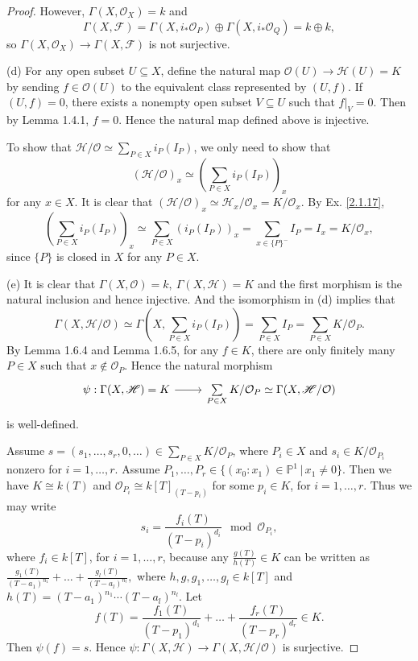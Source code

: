 \documentclass{amsart}
\theoremstyle{remark}\newtheorem{rmk}[theorem]{Remark}
\begin{document}
\begin{proof}
	However, $\Gamma(X,\mathcal{O}_X)=k$ and $$\Gamma(X,\mathscr{F})=\Gamma(X,i_*\mathcal{O}_P)\oplus\Gamma(X,i_*\mathcal{O}_Q)=k\oplus k,$$ so $\Gamma(X,\mathcal{O}_X)\to\Gamma(X,\mathscr{F})$ is not surjective.
	
	(d) For any open subset $U\subseteq X$, define the natural map $\mathcal{O}(U)\to\mathscr{H}(U)=K$ by sending $f\in\mathcal{O}(U)$ to the equivalent class represented by $(U,f)$. If $(U,f)=0$, there exists a nonempty open subset $V\subseteq U$ such that $f|_V=0$. Then by Lemma 1.4.1, $f=0$. Hence the natural map defined above is injective.
	
	To show that $\mathscr{H}/\mathcal{O}\simeq\sum_{P\in X}i_P(I_P)$, we only need to show that $$(\mathscr{H}/\mathcal{O})_x\simeq\left(\sum_{P\in X}i_P(I_P)\right)_x$$ for any $x\in X$. It is clear that $(\mathscr{H}/\mathcal{O})_x\simeq\mathscr{H}_x/\mathcal{O}_x=K/\mathcal{O}_x$. By Ex. \ref{2.1.17}, $$\left(\sum_{P\in X}i_P(I_P)\right)_x\simeq\sum_{P\in X}(i_P(I_P))_x=\sum_{x\in\{P\}^-}I_P=I_x=K/\mathcal{O}_x,$$ since $\{P\}$ is closed in $X$ for any $P\in X$.
	
	(e) It is clear that $\Gamma(X,\mathcal{O})=k,\ \Gamma(X,\mathscr{H})=K$ and the first morphism is the natural inclusion and hence injective. And the isomorphism in (d) implies that $$\Gamma(X,\mathscr{H}/\mathcal{O})\simeq\Gamma\left(X,\sum_{P\in X}i_P(I_P)\right)=\sum_{P\in X}I_P=\sum_{P\in X}K/\mathcal{O}_P.$$ By Lemma 1.6.4 and Lemma 1.6.5, for any $f\in K$, there are only finitely many $P\in X$ such that $x\notin\mathcal{O}_P$. Hence the natural morphism 
	\begin{equation*}
		\begin{tikzcd}
			{\psi:\Gamma(X,\mathscr{H})=K} \arrow[r] & {\sum\limits_{P\in X}K/\mathcal{O}_P\simeq\Gamma(X,\mathscr{H}/\mathcal{O})}
		\end{tikzcd}
	\end{equation*}
	is well-defined.
	
	Assume $s=(s_1,\dots,s_r,0,\dots)\in\sum_{P\in X}K/\mathcal{O}_P$, where $P_i\in X$ and $s_i\in K/\mathcal{O}_{P_i}$ nonzero for $i=1,\dots,r$. Assume $P_1,\dots,P_r\in\{(x_0:x_1)\in\mathbb{P}^1\,|\,x_1\neq0\}$. Then we have $K\cong k(T)$ and $\mathcal{O}_{P_i}\cong k[T]_{(T-p_i)}$ for some $p_i\in K$, for $i=1,\dots,r$. Thus we may write $$s_i=\frac{f_i(T)}{(T-p_i)^{d_i}}\mod\mathcal{O}_{P_i},$$ where $f_i\in k[T]$, for $i=1,\dots,r$, because any $\frac{g(T)}{h(T)}\in K$ can be written as $\frac{g_1(T)}{(T-a_1)^{n_1}}+\dots+\frac{g_l(T)}{(T-a_l)^{n_l}},$ where $h,g,g_1,\dots,g_l\in k[T]$ and $h(T)=(T-a_1)^{n_1}\cdots(T-a_l)^{n_l}$. Let $$f(T)=\frac{f_1(T)}{(T-p_1)^{d_1}}+\dots+\frac{f_r(T)}{(T-p_r)^{d_r}}\in K.$$ Then $\psi(f)=s$. Hence $\psi:\Gamma(X,\mathscr{H})\to\Gamma(X,\mathscr{H}/\mathcal{O})$ is surjective.
	

\end{proof}
\end{document}
